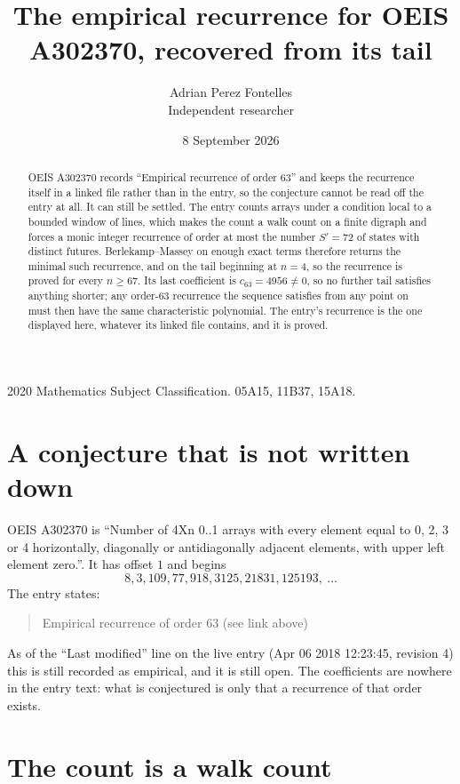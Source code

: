 \documentclass[11pt,a4paper]{article}
\title{The empirical recurrence for OEIS A302370, recovered from its tail}
\author{Adrian Perez Fontelles\\ \small Independent researcher}
\date{8 September 2026}
\theoremstyle{plain}
\theoremstyle{definition}
\begin{document}
\maketitle

\begin{abstract}
OEIS A302370 records ``Empirical recurrence of order $63$'' and keeps the recurrence itself in
a linked file rather than in the entry, so the conjecture cannot be read off the entry at all.
It can still be settled. The entry counts arrays under a condition local to a bounded window of
lines, which makes the count a walk count on a finite digraph and forces a monic integer
recurrence of order at most the number $S'=72$ of states with distinct futures. Berlekamp--Massey on
enough exact terms therefore returns the minimal such recurrence, and on the tail beginning at $n=4$, so the recurrence is proved for every $n\ge67$.
Its last coefficient is $c_{63}=4956\neq0$, so no further tail satisfies anything
shorter; any order-$63$ recurrence the sequence satisfies from any point on must then have
the same characteristic polynomial. The entry's recurrence is the one displayed here, whatever
its linked file contains, and it is proved.
\end{abstract}

\noindent\small 2020 Mathematics Subject Classification. 05A15, 11B37, 15A18.\normalsize

\section{A conjecture that is not written down}

OEIS A302370 is ``Number of 4Xn 0..1 arrays with every element equal to 0, 2, 3 or 4 horizontally, diagonally or antidiagonally adjacent elements, with upper left element zero.''. It has offset $1$ and begins
\[
8, 3, 109, 77, 918, 3125, 21831, 125193,\ \dots
\]
The entry states:
\begin{quote}
Empirical recurrence of order 63 (see link above)
\end{quote}
As of the ``Last modified'' line on the live entry (Apr 06 2018 12:23:45, revision 4)
this is still recorded as empirical, and it is still open. The coefficients are nowhere in the
entry text: what is conjectured is only that a recurrence of that order exists.

\section{The count is a walk count}
\end{document}
